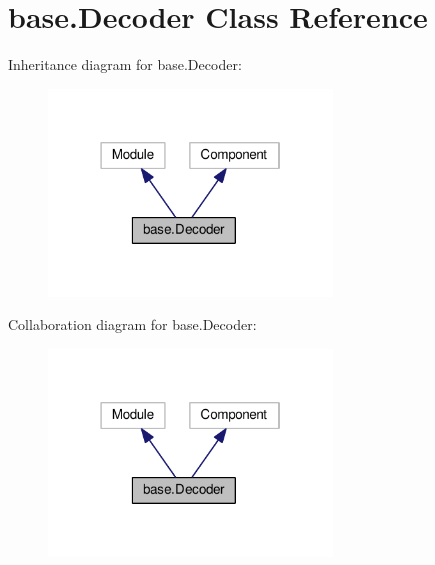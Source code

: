 \hypertarget{classbase_1_1Decoder}{}\section{base.\+Decoder Class Reference}
\label{classbase_1_1Decoder}


Inheritance diagram for base.\+Decoder\+:
\nopagebreak
\begin{figure}[H]
\begin{center}
\leavevmode
\includegraphics[width=214pt]{classbase_1_1Decoder__inherit__graph}
\end{center}
\end{figure}


Collaboration diagram for base.\+Decoder\+:
\nopagebreak
\begin{figure}[H]
\begin{center}
\leavevmode
\includegraphics[width=214pt]{classbase_1_1Decoder__coll__graph}
\end{center}
\end{figure}
